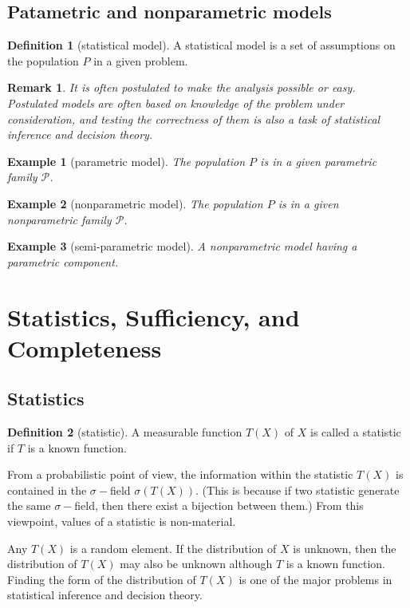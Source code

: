 \documentclass{article}
\newtheorem{Eg}{Example}[section]
\newtheorem*{Rk}{Remark}
\theoremstyle{definition}
\newtheorem{Def}{Definition}[section]
\begin{document}
\subsection{Patametric and nonparametric models}
\begin{Def}[statistical model]
A statistical model is a set of assumptions on the population $P$ in a given problem. 
\end{Def}
\begin{Rk}
It is often postulated to make the analysis possible or easy. Postulated models are often based on knowledge of the problem under consideration, and testing the correctness of them is also a task of statistical inference and decision theory.
\end{Rk}
\begin{Eg}[parametric model]
The population $P$ is in a given parametric family $\mathcal{P}$.
\end{Eg}
\begin{Eg}[nonparametric model]
The population $P$ is in a given nonparametric family $\mathcal{P}$.
\end{Eg}
\begin{Eg}[semi-parametric model]
A nonparametric model having a parametric component.
\end{Eg}

\section{Statistics, Sufficiency, and Completeness}
\subsection{Statistics}
\begin{Def}[statistic]
A measurable function $T(X)$ of $X$ is called a statistic if $T$ is a known function.
\end{Def}
From a probabilistic point of view, the information within the statistic $T(X)$ is contained in the $\sigma-$field $\sigma(T(X))$. (This is because if two statistic generate the same $\sigma-$field, then there exist a bijection between them.) From this viewpoint, values of a statistic is non-material.\par
Any $T(X)$ is a random element. If the distribution of $X$ is unknown, then the distribution of $T(X)$ may also be unknown although $T$ is a known function. Finding the form of the distribution of $T(X)$ is one of the major problems in statistical inference and decision theory.
\end{document}
